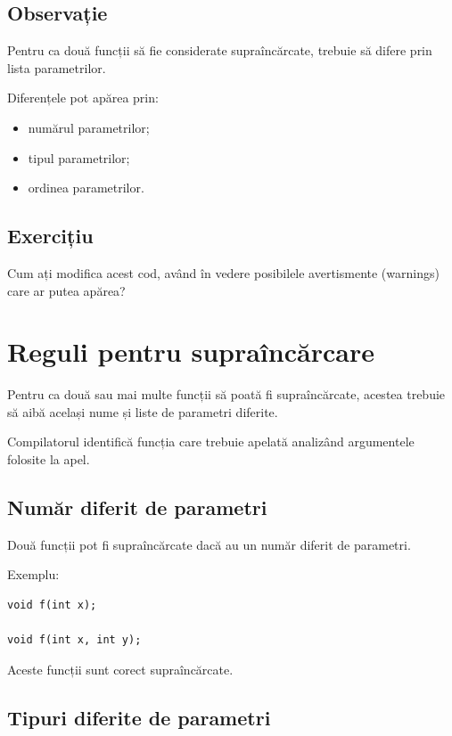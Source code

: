\documentclass[12pt,a4paper]{article}
\begin{document}
\subsection{Observație}

Pentru ca două funcții să fie considerate supraîncărcate, trebuie să difere prin lista parametrilor.

Diferențele pot apărea prin:

\begin{itemize}
\item numărul parametrilor;
\item tipul parametrilor;
\item ordinea parametrilor.
\end{itemize}

\subsection{Exercițiu}
Cum ați modifica acest cod, având în vedere posibilele avertismente (warnings) care ar putea apărea?








\section{Reguli pentru supraîncărcare}

Pentru ca două sau mai multe funcții să poată fi supraîncărcate, acestea trebuie să aibă același nume și liste de parametri diferite.

Compilatorul identifică funcția care trebuie apelată analizând argumentele folosite la apel.

\subsection{Număr diferit de parametri}

Două funcții pot fi supraîncărcate dacă au un număr diferit de parametri.

Exemplu:

\begin{verbatim}
void f(int x);

void f(int x, int y);
\end{verbatim}

Aceste funcții sunt corect supraîncărcate.

\subsection{Tipuri diferite de parametri}
\end{document}
